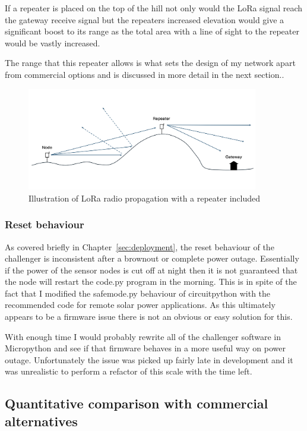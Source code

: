If a repeater is placed on the top of the hill not only would the LoRa signal
reach the gateway receive signal but the repeaters increased elevation would
give a significant boost to its range as the total area with a line of sight to
the repeater would be vastly increased.

The range that this repeater allows is what sets the design of my network apart
from commercial options and is discussed in more detail in the next section..

\begin{figure}[H]
    \centering
    \includegraphics[width=0.9\textwidth]{contents/part-4/fig4/repeater.png}
    \caption{Illustration of LoRa radio propagation with a repeater included}
    \label{fig:repeater}
\end{figure}

\subsubsection{Reset behaviour}\label{sec:reset-behaviour}

As covered briefly in Chapter~\ref{sec:deployment}, the reset behaviour of the
challenger is inconsistent after a brownout or complete power outage.
Essentially if the power of the sensor nodes is cut off at night then it is not
guaranteed that the node will restart the code.py program in the morning. This
is in spite of the fact that I modified the safemode.py behaviour of
circuitpython with the recommended code for remote solar power applications. As
this ultimately appears to be a firmware issue there is not an obvious or easy
solution for this. 

With enough time I would probably rewrite all of the challenger software in
Micropython and see if that firmware behaves in a more useful way on power
outage. Unfortunately the issue was picked up fairly late in development and it
was unrealistic to perform a refactor of this scale with the time left.

\subsection{Quantitative comparison with commercial alternatives}

